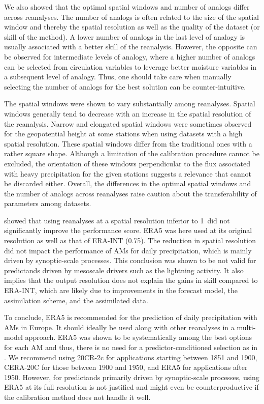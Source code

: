 \documentclass[alpha-refs]{wiley-article}
\begin{document}
We also showed that the optimal spatial windows and number of analogs differ across reanalyses. The number of analogs is often related to the size of the spatial window and thereby the spatial resolution as well as the quality of the dataset (or skill of the method). A lower number of analogs in the last level of analogy is usually associated with a better skill of the reanalysis. However, the opposite can be observed for intermediate levels of analogy, where a higher number of analogs can be selected from circulation variables to leverage better moisture variables in a subsequent level of analogy. Thus, one should take care when manually selecting the number of analogs for the best solution can be counter-intuitive.

The spatial windows were shown to vary substantially among reanalyses. Spatial windows generally tend to decrease with an increase in the spatial resolution of the reanalysis. Narrow and elongated spatial windows were sometimes observed for the geopotential height at some stations when using datasets with a high spatial resolution. These spatial windows differ from the traditional ones with a rather square shape. Although a limitation of the calibration procedure cannot be excluded, the orientation of these windows perpendicular to the flux associated with heavy precipitation for the given stations suggests a relevance that cannot be discarded either. Overall, the differences in the optimal spatial windows and the number of analogs across reanalyses raise caution about the transferability of parameters among datasets.

\citet{Horton2018b} showed that using reanalyses at a spatial resolution inferior to  1\degree\ did not significantly improve the performance score. ERA5 was here used at its original resolution as well as that of ERA-INT (0.75\degree). The reduction in spatial resolution did not impact the performance of AMs for daily precipitation, which is mainly driven by synoptic-scale processes. This conclusion was shown to be not valid for predictands driven by mesoscale drivers such as the lightning activity. It also implies that the output resolution does not explain the gains in skill compared to ERA-INT, which are likely due to improvements in the forecast model, the assimilation scheme, and the assimilated data.

To conclude, ERA5 is recommended for the prediction of daily precipitation with AMs in Europe. It should ideally be used along with other reanalyses in a multi-model approach. ERA5 was shown to be systematically among the best options for each AM and thus, there is no need for a predictor-conditioned selection as in \citet{Horton2018b}. We recommend using 20CR-2c for applications starting between 1851 and 1900, CERA-20C for those between 1900 and 1950, and ERA5 for applications after 1950. However, for predictands primarily driven by synoptic-scale processes, using ERA5 at its full resolution is not justified and might even be counterproductive if the calibration method does not handle it well.
\end{document}
